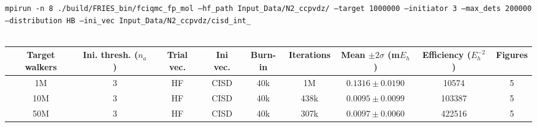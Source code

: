 \documentclass[12pt, landscape]{article}
\begin{document}
\texttt{mpirun -n 8 ./build/FRIES\_bin/fciqmc\_fp\_mol --hf\_path Input\_Data/N2\_ccpvdz/ --target 1000000 --initiator 3 --max\_dets 200000 --distribution HB --ini\_vec Input\_Data/N2\_ccpvdz/cisd\_int\_}
\\~\\
\begin{tabular}{c|c|c|c|c|c|c|c|c}
Target walkers & Ini. thresh. ($n_a$) & Trial vec. & Ini vec. & Burn-in & Iterations & Mean $\pm 2 \sigma$ (m$E_h$) & Efficiency ($E_h^{-2}$) & Figures \\ \hline
1M & 3 & HF & CISD & 40k & 1M & $0.1316 \pm 0.0190$ & 10574 & 5\\
10M & 3 & HF & CISD & 40k & 438k & $0.0095 \pm 0.0099$ & 103387 & 5\\
50M & 3 & HF & CISD & 40k & 307k & $0.0097 \pm 0.0060$ & 422516 & 5 \\
\end{tabular}
\end{document}
